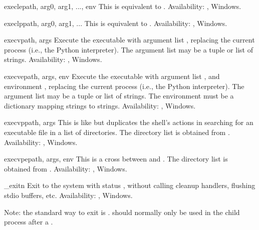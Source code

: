 \begin{funcdesc}{execle}{path, arg0, arg1, ..., env}
This is equivalent to
.
Availability: \UNIX{}, Windows.
\end{funcdesc}

\begin{funcdesc}{execlp}{path, arg0, arg1, ...}
This is equivalent to
.
Availability: \UNIX{}, Windows.
\end{funcdesc}

\begin{funcdesc}{execv}{path, args}
Execute the executable  with argument list ,
replacing the current process (i.e., the Python interpreter).
The argument list may be a tuple or list of strings.
Availability: \UNIX{}, Windows.
\end{funcdesc}

\begin{funcdesc}{execve}{path, args, env}
Execute the executable  with argument list ,
and environment ,
replacing the current process (i.e., the Python interpreter).
The argument list may be a tuple or list of strings.
The environment must be a dictionary mapping strings to strings.
Availability: \UNIX{}, Windows.
\end{funcdesc}

\begin{funcdesc}{execvp}{path, args}
This is like  but duplicates
the shell's actions in searching for an executable file in a list of
directories.  The directory list is obtained from
.
Availability: \UNIX{}, Windows.
\end{funcdesc}

\begin{funcdesc}{execvpe}{path, args, env}
This is a cross between  and .
The directory list is obtained from .
Availability: \UNIX{}, Windows.
\end{funcdesc}

\begin{funcdesc}{_exit}{n}
Exit to the system with status , without calling cleanup
handlers, flushing stdio buffers, etc.
Availability: \UNIX{}, Windows.

Note: the standard way to exit is .
 should normally only be used in the child process
after a .
\end{funcdesc}

